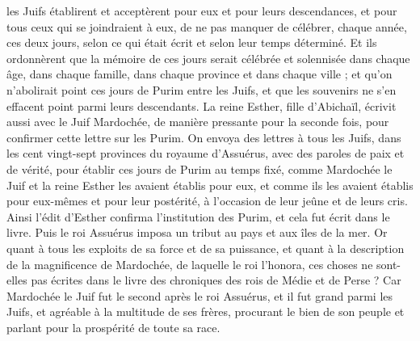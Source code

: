 \begin{multicols}{2}
les Juifs établirent et acceptèrent pour eux et pour leurs descendances, et pour tous ceux qui se joindraient à eux, de ne pas manquer de célébrer, chaque année, ces deux jours, selon ce qui était écrit et selon leur temps déterminé.
Et ils ordonnèrent que la mémoire de ces jours serait célébrée et solennisée dans chaque âge, dans chaque famille, dans chaque province et dans chaque ville ; et qu'on n'abolirait point ces jours de Purim entre les Juifs, et que les souvenirs ne s'en effacent point parmi leurs descendants.
La reine Esther, fille d'Abichaïl, écrivit aussi avec le Juif Mardochée, de manière pressante pour la seconde fois, pour confirmer cette lettre sur les Purim.
On envoya des lettres à tous les Juifs, dans les cent vingt-sept provinces du royaume d'Assuérus, avec des paroles de paix et de vérité,
pour établir ces jours de Purim au temps fixé, comme Mardochée le Juif et la reine Esther les avaient établis pour eux, et comme ils les avaient établis pour eux-mêmes et pour leur postérité, à l'occasion de leur jeûne et de leurs cris.
Ainsi l'édit d'Esther confirma l'institution des Purim, et cela fut écrit dans le livre.
\VerseOne{}Puis le roi Assuérus imposa un tribut au pays et aux îles de la mer.
Or quant à tous les exploits de sa force et de sa puissance, et quant à la description de la magnificence de Mardochée, de laquelle le roi l'honora, ces choses ne sont-elles pas écrites dans le livre des chroniques des rois de Médie et de Perse ?
Car Mardochée le Juif fut le second après le roi Assuérus, et il fut grand parmi les Juifs, et agréable à la multitude de ses frères, procurant le bien de son peuple et parlant pour la prospérité de toute sa race.
\PPE{}
\end{multicols}
